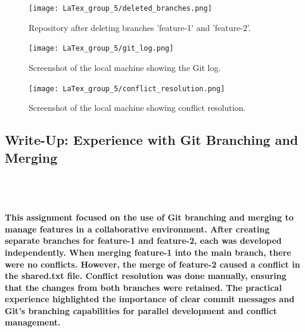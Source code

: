 \documentclass[12pt, a4paper]{article}
\begin{document}
\begin{figure}[h!]
    \centering
    \texttt{[image: LaTex\_group\_5/deleted\_branches.png]}
       \hspace{4 cm}
    \caption{Repository after deleting branches 'feature-1' and 'feature-2'.}
    \label{fig:enter-label}
\end{figure}
\hspace{6 cm}
\begin{figure}[h!]
    \centering
    \texttt{[image: LaTex\_group\_5/git\_log.png]} %
    \hspace{4 cm}
    \caption{Screenshot of the local machine showing the Git log.}
\end{figure}
\hspace{6 cm}
\begin{figure}[h!]
    \centering
    \texttt{[image: LaTex\_group\_5/conflict\_resolution.png]} %
       \hspace{4 cm}
    \caption{Screenshot of the local machine showing conflict resolution.}
\end{figure}
\newpage
{}
\vspace{-1.5cm}
\subsection*{\Huge{Write-Up: Experience with Git Branching and Merging}}
\\\
\paragraph {This assignment focused on the use of Git branching and merging to manage features in a collaborative environment. After creating separate branches for feature-1 and feature-2, each was developed independently.
When merging feature-1 into the main branch, there were no conflicts. However, the merge of feature-2 caused a conflict in the shared.txt file. Conflict resolution was done manually, ensuring that the changes from both branches were retained.
The practical experience highlighted the importance of clear commit messages and Git’s branching capabilities for parallel development and conflict management.}
\end{document}
